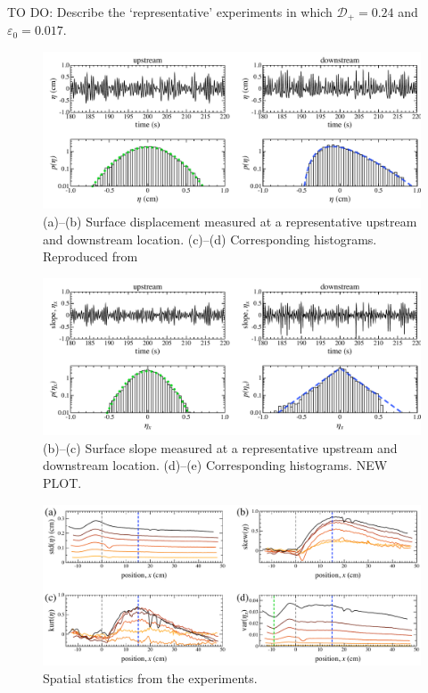\documentclass[11pt]{article}
\newcommand{\eps}{\varepsilon}
\newcommand{\drat}{\mathcal{D}}
\newcommand{\dratdn}{\drat_+}
\newcommand{\epsup}{\eps_0}
\begin{document}
TO DO: Describe the `representative' experiments in which $\dratdn = 0.24$ and $\epsup = 0.017$.

\begin{figure}%
\begin{center}
\includegraphics[width = 0.85 \linewidth]{Figs/fig2.pdf}
\caption{
(a)--(b) Surface displacement measured at a representative upstream and downstream location. (c)--(d) Corresponding histograms. Reproduced from \cite{bolles2019anomalous}
}
\label{fig2}
\end{center}
\end{figure}
 
\begin{figure}%
\begin{center}
\includegraphics[width = 0.85 \linewidth]{Figs/fig3.pdf}
\caption{
(b)--(c) Surface slope measured at a representative upstream and downstream location. (d)--(e) Corresponding histograms. NEW PLOT.
}
\label{fig3}
\end{center}
\end{figure}
 
\begin{figure}%
\begin{center}
\includegraphics[width = 0.85 \linewidth]{Figs/fig4.pdf}
\caption{
Spatial statistics from the experiments.
}
\label{fig4}
\end{center}
\end{figure}
 
\end{document}
